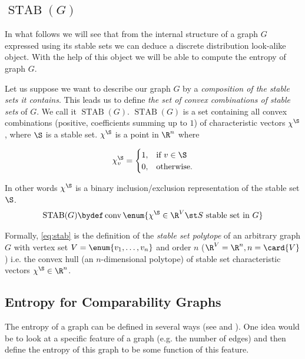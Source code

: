 


\subsection*{$\operatorname{STAB}(G)$}
\label{tree:poset:graph:stab}

In what follows we will see that from the internal structure of a graph $G$
expressed using its stable sets we can deduce a discrete distribution
look-alike object. With the help of this object we will be able to compute the
entropy of graph $G$.

Let us suppose we want to describe our graph $G$ by a \emph{composition of the
stable sets it contains}. This leads us to define \emph{the set of convex
combinations of stable sets} of $G$. We call it $\operatorname{STAB}(G)$.
$\operatorname{STAB}(G)$ is a set containing all convex combinations (positive,
coefficients summing up to $1$) of characteristic vectors $\chi^{\S}$, where $\S$
is a stable set. $\chi^{\S}$ is a point in $\R^n$ where

$$ \chi^{\S}_v =\begin{cases}
      1, & \text{if}\ v \in \S\\
      0, & \text{otherwise}.
    \end{cases}$$


In other words $\chi^{\S}$ is a binary inclusion/exclusion representation of the
stable set $\S$.
\begin{equation}
\operatorname{STAB}(G) \bydef \operatorname{conv}\enum{\chi^{\S} \in \R^V \st
S\text{ stable set in }G}
\label{eq:stab}
\end{equation}

Formally, \ref{eq:stab} is the definition of the \emph{stable set polytope} of
an arbitrary graph $G$ with vertex set $V = \enum{v_1, \ldots, v_n }$
and order $n$ ($\R^V = \R^n, n = \card{V}$) i.e. the convex hull (an $n$-dimensional
polytope) of stable set characteristic vectors $\chi^{\S} \in \R^n$.



\subsection*{Entropy for Comparability Graphs}

The entropy of a graph can be defined in several ways (see
\citet*{mowshowitz2012entropy} and \citet*{simonyi1995graph}). One idea would
be to look at a specific feature of a graph (e.g. the number of edges) and then
define the entropy of this graph to be some function of this feature.

